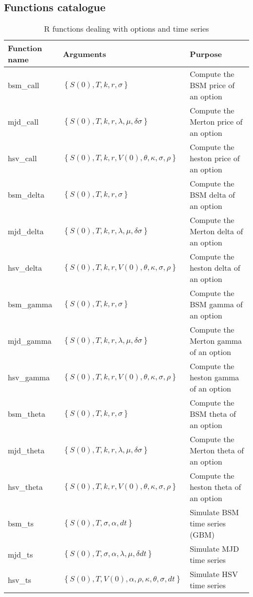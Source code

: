 \documentclass[a4paper, 12pt]{report}
\begin{document}
\begin{appendices}
\chapter{Functions catalogue}
\label{cha:append:function}


\begin{table}[ht]
  \begin{tabularx}{\textwidth}{llX}
    \hline
    Function name & Arguments & Purpose \\
    \hline
    bsm\_call & $\left \{ S(0), T, k, r, \sigma \right \}$ & Compute the BSM price of an option \\
    mjd\_call & $\left \{ S(0), T, k, r, \lambda, \mu, \delta \sigma \right \}$ & Compute the Merton price of an option \\
    hsv\_call & $\left \{ S(0), T, k, r, V(0), \theta, \kappa, \sigma, \rho \right \}$ & Compute the heston price of an option \\
    bsm\_delta & $\left \{ S(0), T, k, r, \sigma \right \}$ & Compute the BSM delta of an option \\
    mjd\_delta & $\left \{ S(0), T, k, r, \lambda, \mu, \delta \sigma \right \}$ & Compute the Merton delta of an option \\
    hsv\_delta & $\left \{ S(0), T, k, r, V(0), \theta, \kappa, \sigma, \rho \right \}$ & Compute the heston delta of an option \\
    bsm\_gamma & $\left \{ S(0), T, k, r, \sigma \right \}$ & Compute the BSM gamma of an option \\
    mjd\_gamma & $\left \{ S(0), T, k, r, \lambda, \mu, \delta \sigma \right \}$ & Compute the Merton gamma of an option \\
    hsv\_gamma & $\left \{ S(0), T, k, r, V(0), \theta, \kappa, \sigma, \rho \right \}$ & Compute the heston gamma of an option \\
    bsm\_theta & $\left \{ S(0), T, k, r, \sigma \right \}$ & Compute the BSM theta of an option \\
    mjd\_theta & $\left \{ S(0), T, k, r, \lambda, \mu, \delta \sigma \right \}$ & Compute the Merton theta of an option \\
    hsv\_theta & $\left \{ S(0), T, k, r, V(0), \theta, \kappa, \sigma, \rho \right \}$ & Compute the heston theta of an option \\
    bsm\_ts & $\left \{ S(0), T, \sigma, \alpha, dt \right \}$ & Simulate BSM time series (GBM) \\
    mjd\_ts & $\left \{ S(0), T, \sigma, \alpha, \lambda, \mu, \delta dt \right \}$ & Simulate MJD time series \\
    hsv\_ts & $\left \{ S(0), T, V(0), \alpha, \rho, \kappa, \theta, \sigma, dt \right \}$ & Simulate HSV time series \\
  \end{tabularx}
  \caption{R functions dealing with options and time series}
  \label{t:append:function:r}
\end{table}


\end{appendices}
\end{document}
